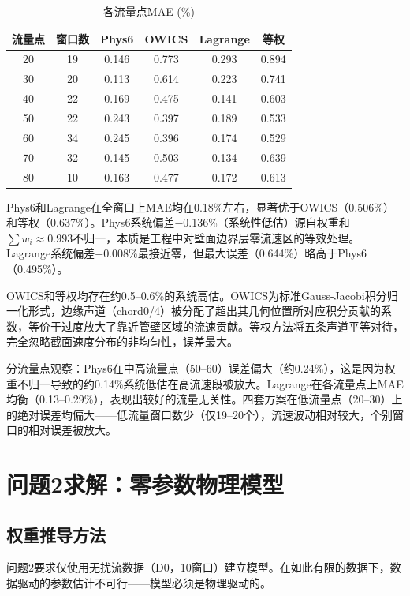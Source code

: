 \begin{table}[H]
\centering
\caption{各流量点MAE (\%)}
\label{tab:q1_by_flow}
\begin{tabular}{cccccc}
\toprule
流量点 & 窗口数 & Phys6 & OWICS & Lagrange & 等权 \\
\midrule
20 & 19 & 0.146 & 0.773 & 0.293 & 0.894 \\
30 & 20 & 0.113 & 0.614 & 0.223 & 0.741 \\
40 & 22 & 0.169 & 0.475 & 0.141 & 0.603 \\
50 & 22 & 0.243 & 0.397 & 0.189 & 0.533 \\
60 & 34 & 0.245 & 0.396 & 0.174 & 0.529 \\
70 & 32 & 0.145 & 0.503 & 0.134 & 0.639 \\
80 & 10 & 0.163 & 0.477 & 0.172 & 0.613 \\
\bottomrule
\end{tabular}
\end{table}

Phys6和Lagrange在全窗口上MAE均在0.18\%左右，显著优于OWICS（0.506\%）和等权（0.637\%）。Phys6系统偏差$-$0.136\%（系统性低估）源自权重和$\sum w_i \approx 0.993$不归一，本质是工程中对壁面边界层零流速区的等效处理。Lagrange系统偏差$-$0.008\%最接近零，但最大误差（0.644\%）略高于Phys6（0.495\%）。

OWICS和等权均存在约0.5--0.6\%的系统高估。OWICS为标准Gauss-Jacobi积分归一化形式，边缘声道（chord0/4）被分配了超出其几何位置所对应积分贡献的系数，等价于过度放大了靠近管壁区域的流速贡献。等权方法将五条声道平等对待，完全忽略截面速度分布的非均匀性，误差最大。

分流量点观察：Phys6在中高流量点（50--60）误差偏大（约0.24\%），这是因为权重不归一导致的约0.14\%系统低估在高流速段被放大。Lagrange在各流量点上MAE均衡（0.13--0.29\%），表现出较好的流量无关性。四套方案在低流量点（20--30）上的绝对误差均偏大——低流量窗口数少（仅19--20个），流速波动相对较大，个别窗口的相对误差被放大。

\section{问题2求解：零参数物理模型}

\subsection{权重推导方法}

问题2要求仅使用无扰流数据（D0，10窗口）建立模型。在如此有限的数据下，数据驱动的参数估计不可行——模型必须是物理驱动的。

